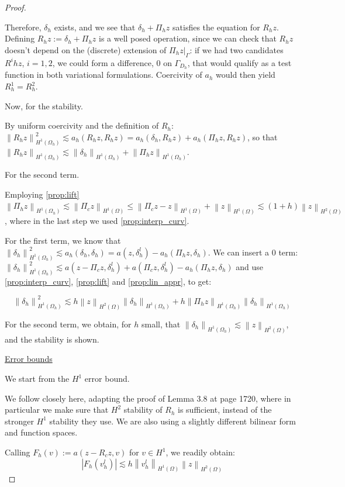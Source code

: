 \documentclass[english,a4paper,9pt,oneside]{scrbook}	%
\theoremstyle{break}
\newenvironment{mproof}[1][\proofname]{%
  \begin{proof}[#1]$ $\par\nobreak\ignorespaces
}{%
  \end{proof}
}
\renewcommand*{\proofname}{Proof}
\theoremstyle{remark}
\newcommand{\norm}[1]{\left\lVert#1\right\rVert}
\begin{document}
\begin{appendices}
\begin{mproof}
Therefore, $\delta_h$ exists, and we see that $\delta_h+\Pi_h z$ satisfies the equation for $R_hz$. Defining $R_h z := \delta_h + \Pi_h z$ is a well posed operation, since we can check that $R_h z$ doesn't depend on the (discrete) extension of $\Pi_h z|_{\Gamma }$: if we had two candidates $R^ihz$, $i=1,2$, we could form a difference, $0$ on $\Gamma_{D_h}$, that would qualify as a test function in both variational formulations. Coercivity of $a_h$ would then yield $R_h^1=R_h^2$.

Now, for the stability.

By uniform coercivity and the definition of $R_h$: $\norm{R_h z}_{H^1(\Omega_h)}^2 \lesssim a_h(R_h z, R_h z) = a_h(\delta_h,R_h z) + a_h(\Pi_h z, R_h z)$, so that $\norm{R_h z}_{H^1(\Omega_h)} \lesssim \norm{\delta_h }_{H^1(\Omega_h)} + \norm{\Pi_h z }_{H^1(\Omega_h)}$.

For the second term.

Employing \cref{prop:lift} $\norm{\Pi_h z }_{H^1(\Omega_h)}\lesssim \norm{\Pi_c z }_{H^1(\Omega)} \leq \norm{\Pi_c z -z }_{H^1(\Omega)}+\norm{z }_{H^1(\Omega)} \lesssim (1+h)\norm{z}_{H^2(\Omega)}$, where in the last step we used \cref{prop:interp_curv}.

For the first term, we know that $ \norm{\delta_h }_{H^1(\Omega_h)}^2 \lesssim a_h(\delta_h, \delta_h) =  a(z, \delta_h^l) - a_h(\Pi_h z, \delta_h)$. We can insert a $0$ term: $ \norm{\delta_h }_{H^1(\Omega_h)}^2 \lesssim a(z-\Pi_c z, \delta_h^l) + a(\Pi_c z, \delta_h^l) - a_h(\Pi_h z, \delta_h)$ and use \cref{prop:interp_curv}, \cref{prop:lift} and \cref{prop:lin_appr}, to get:

$$ \norm{\delta_h }_{H^1(\Omega_h)}^2 \lesssim h \norm{z}_{H^2(\Omega)}\norm{\delta_h}_{H^1(\Omega_h)} + h\norm{\Pi_h z}_{H^1(\Omega_h)}\norm{\delta_h}_{H^1(\Omega_h)}$$

For the second term, we obtain, for $h$ small, that $\norm{\delta_h }_{H^1(\Omega_h)} \lesssim \norm{z}_{H^2(\Omega)}$, and the stability is shown.

\underline{Error bounds}

We start from the $H^1$ error bound.

We follow \cite{ranner} closely here, adapting the proof of Lemma 3.8 at page 1720, where in particular we make sure that $H^2$ stability of $R_h$ is sufficient, instead of the stronger $H^1$ stability they use. We are also using a slightly different bilinear form and function spaces.

Calling $F_h(v):=a(z-R_cz, v)$ for $v \in H^1$, we readily obtain:
$$|F_h(v_h^l)|\lesssim h \norm{v_h^l}_{H^1(\Omega)}\norm{z}_{H^2(\Omega)}$$


\end{mproof}
\end{appendices}
\end{document}
